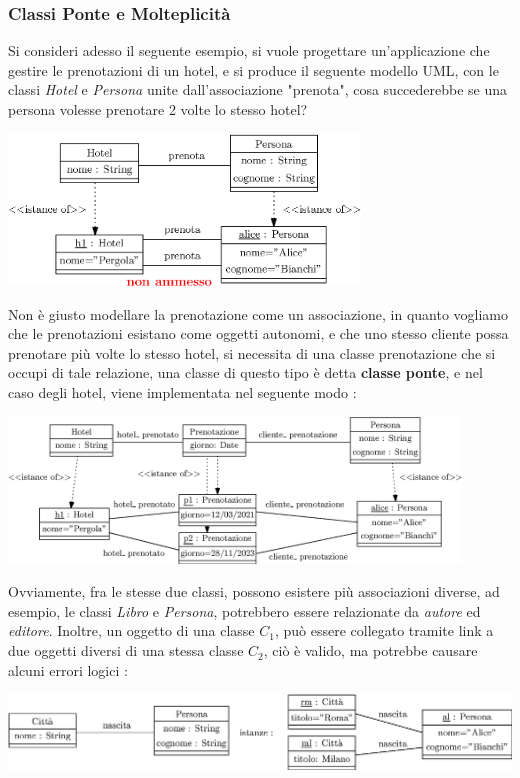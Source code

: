 \documentclass[12pt, letterpaper]{article}
\begin{document}
\subsubsection{Classi Ponte e Molteplicità}
Si consideri adesso il seguente esempio, si vuole progettare un'applicazione che gestire le prenotazioni di un
hotel, e si produce il seguente modello UML, con le classi \textit{Hotel} e \textit{Persona} unite dall'associazione
"prenota", cosa succederebbe se una persona volesse prenotare 2 volte lo stesso hotel? \begin{center}
    \includegraphics[width=0.7\textwidth ]{images/hotelSbagliato.eps}
\end{center}
Non è giusto modellare la prenotazione come un associazione, in quanto vogliamo che le prenotazioni esistano come
oggetti autonomi, e che uno stesso cliente possa prenotare più volte lo stesso hotel, si necessita di una classe
prenotazione che si occupi di tale relazione, una classe di questo tipo è detta \textbf{classe ponte}, e nel
caso degli hotel, viene
implementata nel seguente modo : \begin{center}
    \includegraphics[width=0.9\textwidth ]{images/hotelGiusto.eps}
\end{center}
Ovviamente, fra le stesse due classi, possono esistere più associazioni diverse, ad esempio, le classi
\textit{Libro} e \textit{Persona}, potrebbero essere relazionate da \textit{autore} ed \textit{editore}. Inoltre,
un oggetto di una classe \(C_1\), può essere collegato tramite link a due oggetti diversi di una stessa classe
\(C_2\), ciò è valido, ma potrebbe causare alcuni errori logici : \begin{center}
    \includegraphics[width=1\textwidth ]{images/multError.eps}
\end{center}
\end{document}
